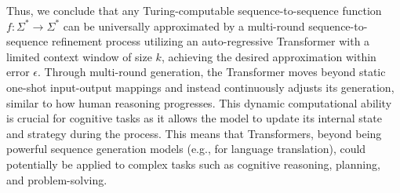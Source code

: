 Thus, we conclude that any Turing-computable sequence-to-sequence function \( f: \Sigma^* \rightarrow \Sigma^* \) can be universally approximated by a multi-round sequence-to-sequence refinement process utilizing an auto-regressive Transformer with a limited context window of size \( k \), achieving the desired approximation within error \( \epsilon \).
Through multi-round generation, the Transformer moves beyond static one-shot input-output mappings and instead continuously adjusts its generation, similar to how human reasoning progresses. This dynamic computational ability is crucial for cognitive tasks as it allows the model to update its internal state and strategy during the process. This means that Transformers, beyond being powerful sequence generation models (e.g., for language translation), could potentially be applied to complex tasks such as cognitive reasoning, planning, and problem-solving.























